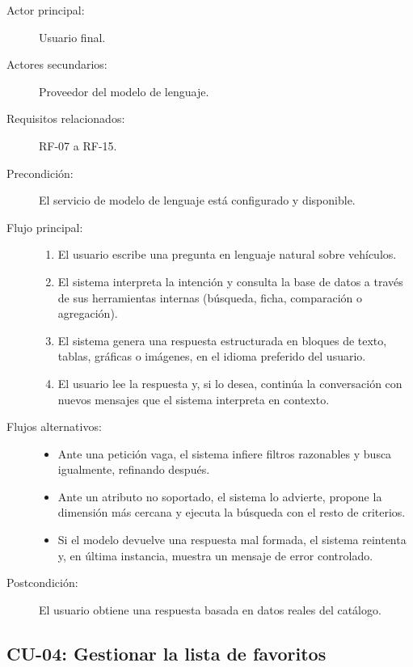 \begin{description}
  \item[Actor principal:] Usuario final.
  \item[Actores secundarios:] Proveedor del modelo de lenguaje.
  \item[Requisitos relacionados:] RF-07 a RF-15.
  \item[Precondición:] El servicio de modelo de lenguaje está configurado y
        disponible.
  \item[Flujo principal:]
        \begin{enumerate}
          \item El usuario escribe una pregunta en lenguaje natural sobre
                vehículos.
          \item El sistema interpreta la intención y consulta la base de datos
                a través de sus herramientas internas (búsqueda, ficha,
                comparación o agregación).
          \item El sistema genera una respuesta estructurada en bloques de
                texto, tablas, gráficas o imágenes, en el idioma preferido del
                usuario.
          \item El usuario lee la respuesta y, si lo desea, continúa la
                conversación con nuevos mensajes que el sistema interpreta en
                contexto.
        \end{enumerate}
  \item[Flujos alternativos:]
        \begin{itemize}
          \item Ante una petición vaga, el sistema infiere filtros razonables y
                busca igualmente, refinando después.
          \item Ante un atributo no soportado, el sistema lo advierte, propone
                la dimensión más cercana y ejecuta la búsqueda con el resto de
                criterios.
          \item Si el modelo devuelve una respuesta mal formada, el sistema
                reintenta y, en última instancia, muestra un mensaje de error
                controlado.
        \end{itemize}
  \item[Postcondición:] El usuario obtiene una respuesta basada en datos reales
        del catálogo.
\end{description}

\subsection{CU-04: Gestionar la lista de favoritos}


